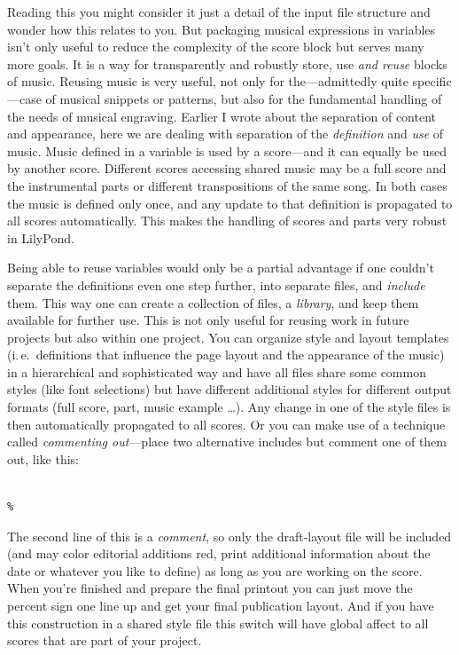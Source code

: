 \documentclass[DIV=12]{scrreprt}
\begin{document}
\medskip
Reading this you might consider it just a detail of the input file structure and wonder how this relates to you.
But packaging musical expressions in variables isn't only useful to reduce the complexity of the score block but serves many more goals.
It is a way for transparently and robustly store, use \emph{and reuse} blocks of music.
Reusing music is very useful, not only for the---admittedly quite specific---case of musical snippets or patterns, but also for the fundamental handling of the needs of musical engraving.
Earlier I wrote about the separation of content and appearance, here we are dealing with separation of the \emph{definition} and \emph{use} of music.
Music defined in a variable is used by a score---and it can equally be used by another score.
Different scores accessing shared music may be a full score and the instrumental parts or different transpositions of the same song.
In both cases the music is defined only once, and any update to that definition is propagated to all scores automatically.
This makes the handling of scores and parts very robust in LilyPond.

Being able to reuse variables would only be a partial advantage if one couldn't separate the definitions even one step further, into separate files, and \emph{include} them.
This way one can create a collection of files, a \emph{library}, and keep them available for further use.
This is not only useful for reusing work in future projects but also within one project.
You can organize style and layout templates (i.\,e.\ definitions that influence the page layout and the appearance of the music) in a hierarchical and sophisticated way and have all files share some common styles (like font selections) but have different additional styles for different output formats (full score, part, music example \dots).
Any change in one of the style files is then automatically propagated to all scores.
Or you can make use of a technique called \emph{commenting out}---place two alternative includes but comment one of them out, like this:

\begin{Verbatim}

%
\end{Verbatim}

The second line of this is a \emph{comment}, so only the draft-layout file will be included (and may color editorial additions red, print additional information about the date or whatever you like to define) as long as you are working on the score.
When you're finished and prepare the final printout you can just move the percent sign one line up and get your final publication layout.
And if you have this construction in a shared style file this switch will have global affect to all scores that are part of your project.
\end{document}
